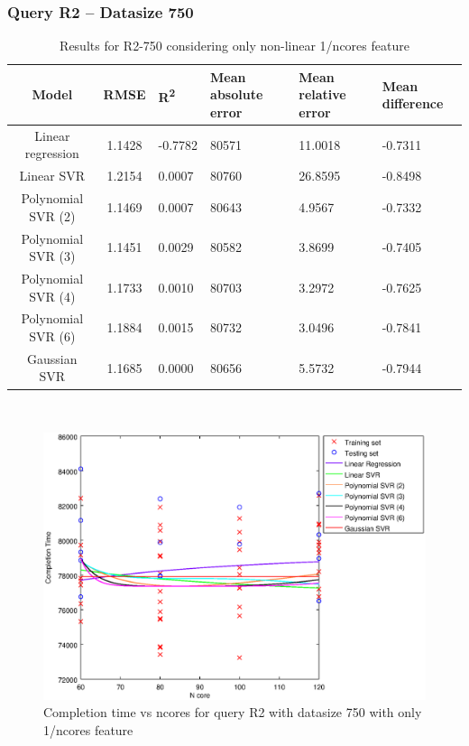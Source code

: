 \documentclass[a4paper,11pt]{article}
\begin{document}
\newpage
\subsubsection{Query R2 -- Datasize 750}
\begin{table}[H]
	\centering
	\begin{adjustbox}{center}
		\begin{tabular}{c | c M{1.2cm} M{2.5cm} M{2.5cm} M{1.8cm}}
			Model & RMSE & R\textsuperscript{2} & Mean absolute error & Mean relative error & Mean difference \tabularnewline
			\hline
			Linear regression & 1.1428 & -0.7782 &  80571 & 11.0018 & -0.7311 \\
			Linear SVR & 1.2154 & 0.0007 &  80760 & 26.8595 & -0.8498 \\
			Polynomial SVR (2) & 1.1469 & 0.0007 &  80643 & 4.9567 & -0.7332 \\
			Polynomial SVR (3) & 1.1451 & 0.0029 &  80582 & 3.8699 & -0.7405 \\
			Polynomial SVR (4) & 1.1733 & 0.0010 &  80703 & 3.2972 & -0.7625 \\
			Polynomial SVR (6) & 1.1884 & 0.0015 &  80732 & 3.0496 & -0.7841 \\
			Gaussian SVR & 1.1685 & 0.0000 &  80656 & 5.5732 & -0.7944 \\
		\end{tabular}
	\end{adjustbox}
	\\
	\caption{Results for R2-750 considering only non-linear 1/ncores feature}
	\label{table_R2_prediction_all}
\end{table}

\begin {figure}[hbtp]
\centering
\includegraphics[width=\textwidth]{output/R2_750_ONLY_1_OVER_NCORES/plot_R2_750.eps}
\caption {Completion time vs ncores for query R2 with datasize 750 with only 1/ncores feature}
\end {figure}
\end{document}
